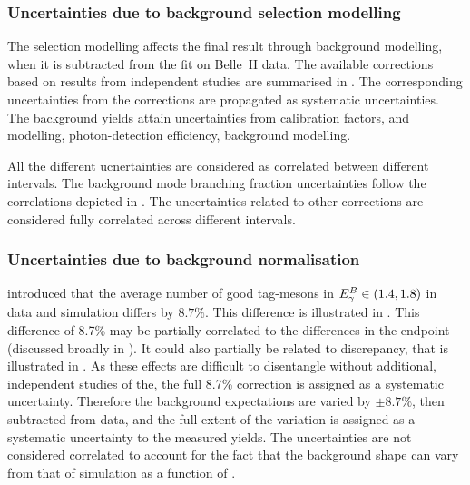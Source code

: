 \subsubsection{Uncertainties due to background selection modelling}\label{sec:correction_systematic}

The selection modelling affects the final result through background modelling, when it is subtracted from the \Mbc fit on Belle~II data.
The available corrections based on results from independent studies are summarised in .
The corresponding uncertainties from the corrections are propagated as systematic uncertainties.
The background yields attain uncertainties from \FEI calibration factors, \piVeto and \etaVeto modelling, photon-detection efficiency, background modelling. 

All the different ucnertainties are considered as correlated between different \EB intervals.
The background mode branching fraction uncertainties follow the correlations depicted in .
The uncertainties related to other corrections are considered fully correlated across different \EB intervals.

\subsubsection{Uncertainties due to background normalisation}\label{sec:background_normalisation_systematic}

 introduced that the average number of 
good tag-\B mesons in ${E^B_{\gamma}}\in(1.4,1.8)$ in data and simulation differs by $8.7\%$.
This difference is illustrated in .
This difference of 8.7\% may be partially correlated to the differences in the \Mbc endpoint (discussed broadly in ).
It could also partially be related to \ZMVA discrepancy, that is illustrated in .
As these effects are difficult to disentangle without additional, independent studies of the, the full 8.7\% correction is assigned as a systematic uncertainty.
Therefore the background expectations are varied by $\pm 8.7\%$, then subtracted from data, and the full extent of the variation is assigned as a systematic uncertainty to the measured \BtoXsgamma yields.
The uncertainties are not considered correlated to account for the fact that the background shape can vary from that of simulation as a function of \EB.



